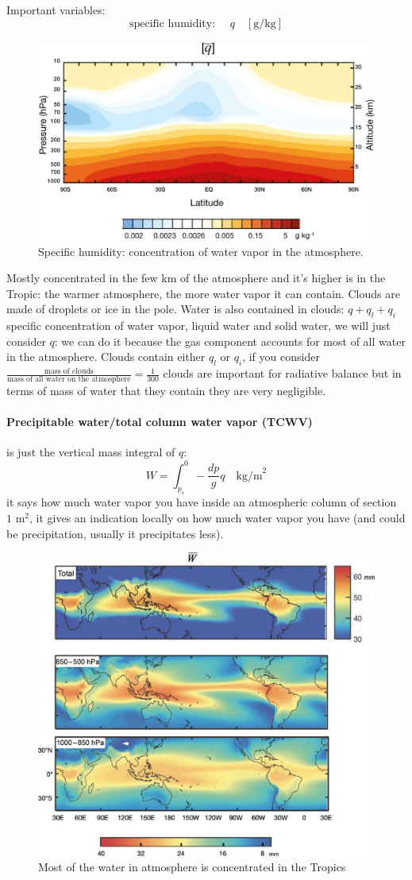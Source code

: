 Important variables:
\[\text{specific humidity: }\quad q \quad [\text{g/kg}]\]
\begin{figure}[htpb]
    \centering
    \includegraphics[width=0.5\linewidth]{uploads/specific humidity.png}
    \caption{Specific humidity: concentration of water vapor in the atmosphere.}
    \label{fig:q}
\end{figure}
Mostly concentrated in the few km of the atmosphere and it's higher is in the Tropic: the warmer atmosphere, the more water vapor it can contain. Clouds are made of droplets or ice in the pole. Water is also contained in clouds: $q+q_l+q_i$ specific concentration of water vapor, liquid water and solid water, we will just consider $q$: we can do it because the gas component accounts for most of all water in the atmosphere. 
Clouds contain either $q_l$ or $q_i$, if you consider $\displaystyle\frac{\text{mass of clouds}}{\text{mass of all water on the atmosphere}}=\frac{1}{300}$
clouds are important for radiative balance but in terms of mass of water that they contain they are very negligible.
\paragraph{Precipitable water/total column water vapor (TCWV)} is just the vertical mass integral of $q$:
\begin{equation}
    W=\int_{p_s}^{0}-\frac{dp}{g}q\quad\text{kg/m}^2
\end{equation}
it says how much water vapor you have inside an atmospheric column of section $1\text{ m}^2$, it gives an indication locally on how much water vapor you have (and could be precipitation, usually it precipitates less).
\begin{figure}[htpb]
    \centering
    \includegraphics[width=0.5\linewidth]{uploads/W.png}
    \caption{Most of the water in atmosphere is concentrated in the Tropics}
    \label{fig:W}
\end{figure}
